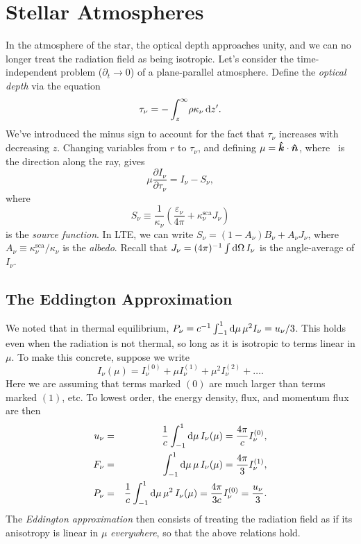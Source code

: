 \chapter[Stellar Atmospheres]{Stellar Atmospheres}

In the atmosphere of the star, the optical depth approaches unity, and we can no longer treat the radiation field as being isotropic. Let's consider the time-independent problem ($\partial_{t}\to 0$) of a plane-parallel atmosphere. Define the \emph{optical depth} via the equation
\begin{equation}\label{e.optical-depth}
\tau_{\nu} = - \int _{z}^{\infty}\!\rho\kappa_{\nu}\,\mathrm{d} z'.
\end{equation}
We've introduced the minus sign to account for the fact that $\tau_{\nu}$ increases with decreasing $z$.
Changing variables from $r$ to $\tau_{\nu}$, and defining $\mu = \boldsymbol{\hat{k}}\cdot\boldsymbol{\hat{n}}$, where \unitn\ is the direction along the ray, gives
\begin{equation}\label{e.planar}
\mu\frac{\partial I_{\nu}}{\partial\tau_{\nu}} = I_{\nu}-S_{\nu},
\end{equation}
where 
\begin{equation}\label{e.source}
S_{\nu} \equiv \frac{1}{\kappa_{\nu}}\left(\frac{\varepsilon_{\nu}}{4\pi} + \kappa_{\nu}^{\mathrm{sca}}J_{\nu}\right)
\end{equation}
is the \emph{source function}. In LTE, we can write $S_{\nu} = (1-A_{\nu})B_{\nu} + A_{\nu}J_{\nu}$, where $A_{\nu} \equiv \kappa_{\nu}^{\mathrm{sca}}/\kappa_{\nu}$ is the \emph{albedo}.  Recall that $J_{\nu} = (4\pi)^{-1}\int\mathrm{d}\Omega\,I_{\nu}$ is the angle-average of $I_{\nu}$.

\section{The Eddington Approximation}

We noted that in thermal equilibrium, $P_{\nu} = c^{-1}\int_{-1}^{1}\mathrm{d}\mu\,\mu^{2}I_{\nu} = u_{\nu}/3$. This holds even when the radiation is not thermal, so long as it is isotropic to terms linear in $\mu$.  To make this concrete, suppose we write
\[ I_{\nu}(\mu) = I_{\nu}^{(0)} + \mu I_{\nu}^{(1)} + \mu^{2}I_{\nu}^{(2)} + \ldots. \]
Here we are assuming that terms marked $(0)$ are much larger than terms marked $(1)$, etc.  To lowest order, the energy density, flux, and momentum flux are then
\begin{eqnarray*}
u_{\nu} &=& \frac{1}{c}\int_{-1}^{1}\mathrm{d}\mu\,I_{\nu}(\mu) = \frac{4\pi}{c} I_{\nu}^{(0)},\\
F_{\nu} &=& \int_{-1}^{1}\mathrm{d}\mu\,\mu\,I_{\nu}(\mu) = \frac{4\pi}{3} I_{\nu}^{(1)},\\
P_{\nu} &=& \frac{1}{c}\int_{-1}^{1}\mathrm{d}\mu\,\mu^{2}\,I_{\nu}(\mu) = \frac{4\pi}{3c}I_{\nu}^{(0)} = \frac{u_{\nu}}{3}.
\end{eqnarray*}
The \emph{Eddington approximation} then consists of treating the radiation field as if its anisotropy is linear in $\mu$ \emph{everywhere}, so that the above relations hold.

